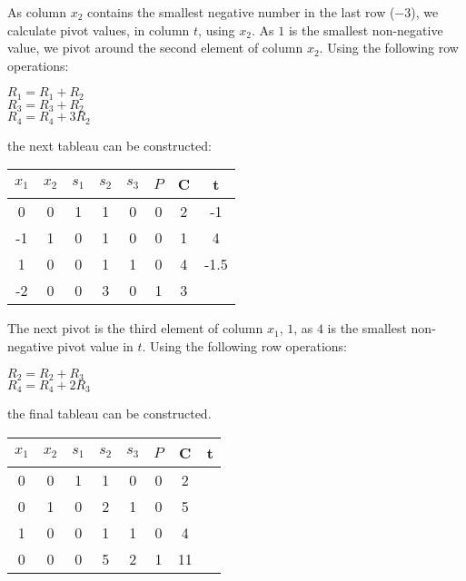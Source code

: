 \documentclass[11pt]{article} %
\begin{document}
As column $x_2$ contains the smallest negative number in the last row ($-3$), we calculate pivot values, in column $t$, using $x_2$. As $1$ is the smallest non-negative value, we pivot around the second element of column $x_2$. Using the following row operations:

\begin{center}

$R_1 = R_1 + R_2$ \\
$R_3 = R_3 + R_2$ \\
$R_4 = R_4 + 3R_2$ \\

\end{center}

the next tableau can be constructed:

\begin{center}

\begin{tabular}{ c c c c c c | c | c }
  $x_1$ & $x_2$ & $s_1$ & $s_2$ & $s_3$ & $P$ & C & t \\ \hline
  0 & 0 & 1 & 1 & 0 & 0 & 2 & -1\\
  -1 & 1 & 0 & 1 & 0 & 0 & 1 & 4\\
  1 & 0 & 0  & 1 & 1 & 0 & 4 & -1.5 \\ \hline
  -2 & 0 & 0 & 3 & 0 & 1 & 3 \\
\end{tabular}

\end{center}

The next pivot is the third element of column $x_1$, $1$, as $4$ is the smallest non-negative pivot value in $t$.  Using the following row operations:

\begin{center}

$R_2 = R_2 + R_3$ \\
$R_4 = R_4 + 2R_3$ \\

\end{center}

the final tableau can be constructed.

\begin{center}

\begin{tabular}{ c c c c c c | c | c }
  $x_1$ & $x_2$ & $s_1$ & $s_2$ & $s_3$ & $P$ & C & t \\ \hline
  0 & 0 & 1 & 1 & 0 & 0 & 2 &\\
  0 & 1 & 0 & 2 & 1 & 0 & 5 &\\
  1 & 0 & 0  & 1 & 1 & 0 & 4 & \\ \hline
  0 & 0 & 0 & 5 & 2 & 1 & 11 \\
\end{tabular}

\end{center}
\end{document}
